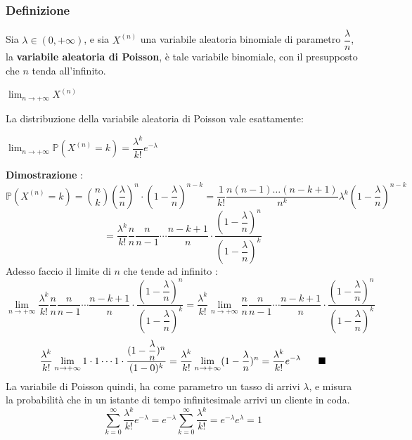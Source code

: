 \documentclass[12pt, letterpaper]{article}
\newcommand{\Prob}{{\mathbb P}}
\begin{document}
\subsubsection{Definizione}
Sia \(\lambda\in (0,+\infty)\), e sia \(X^{(n)}\) una variabile aleatoria binomiale di parametro \(\dfrac{\lambda}{n}\), 
la \textbf{variabile aleatoria di Poisson}, è tale variabile binomiale, con il presupposto che \(n\) tenda all'infinito.\begin{center}
    \( \displaystyle\lim_{n\rightarrow+\infty} X^{(n)} \)
\end{center}
La distribuzione della variabile aleatoria di Poisson vale esattamente:\begin{center} \(\lim_{n\rightarrow+\infty}\Prob(X^{(n)}=k)=\dfrac{\lambda^k}{k!}e^{-\lambda}\)
\end{center}
\textbf{Dimostrazione }: \begin{equation}
    \Prob(X^{(n)}=k)=\binom{n}{k}(\dfrac{\lambda}{n})^n\cdot(1-\dfrac{\lambda}{n})^{n-k}=\dfrac{1}{k!}
    \dfrac{n(n-1)\dots (n-k+1)}{n^k}\lambda^k(1-\dfrac{\lambda}{n})^{n-k}
\end{equation}\begin{equation}
    =\dfrac{\lambda^k}{k!}\dfrac{n}{n}\dfrac{n}{n-1}\cdots \dfrac{n-k+1}{n}\cdot\dfrac{(1-\dfrac{\lambda}{n})^n}{(1-\dfrac{\lambda}{n})^k}
\end{equation}
Adesso faccio il limite di \(n\) che tende ad infinito :\begin{equation}
    \lim_{n\rightarrow+\infty}\dfrac{\lambda^k}{k!}\dfrac{n}{n}\dfrac{n}{n-1}\cdots \dfrac{n-k+1}{n}\cdot\dfrac{(1-\dfrac{\lambda}{n})^n}{(1-\dfrac{\lambda}{n})^k}=
    \dfrac{\lambda^k}{k!}\lim_{n\rightarrow+\infty}\dfrac{n}{n}\dfrac{n}{n-1}\cdots \dfrac{n-k+1}{n}\cdot\dfrac{(1-\dfrac{\lambda}{n})^n}{(1-\dfrac{\lambda}{n})^k}
\end{equation}\begin{equation}
    \dfrac{\lambda^k}{k!}\lim_{n\rightarrow+\infty}1\cdot 1\cdots 1 \cdot \dfrac{(1-\dfrac{\lambda}{n})^n}{(1-0)^k}=\dfrac{\lambda^k}{k!}\lim_{n\rightarrow+\infty}(1-\dfrac{\lambda}{n})^n=\dfrac{\lambda^k}{k!}e^{-\lambda}\text{\hphantom{text}}\blacksquare
\end{equation}
La variabile di Poisson quindi, ha come parametro un tasso di arrivi \(\lambda\), e misura la probabilità 
che in un istante di tempo infinitesimale arrivi un cliente in coda.\begin{equation}
    \sum_{k=0}^\infty\dfrac{\lambda^k}{k!}e^{-\lambda}=e^{-\lambda}\sum_{k=0}^\infty\dfrac{\lambda^k}{k!}=e^{-\lambda}e^{\lambda}=1
\end{equation}
\end{document}
